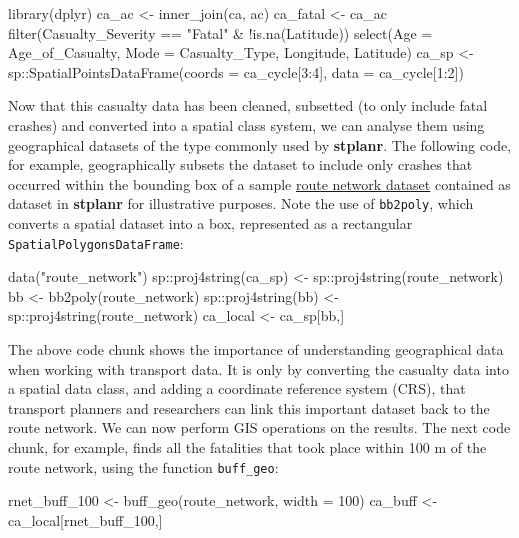 \begin{Schunk}
\begin{Sinput}
library(dplyr)
ca_ac <- inner_join(ca, ac)
ca_fatal <- ca_ac %
  filter(Casualty_Severity == "Fatal" & !is.na(Latitude)) %
  select(Age = Age_of_Casualty, Mode = Casualty_Type, Longitude, Latitude)
ca_sp <- sp::SpatialPointsDataFrame(coords = ca_cycle[3:4], data = ca_cycle[1:2])
\end{Sinput}
\end{Schunk}

Now that this casualty data has been cleaned, subsetted (to only include
fatal crashes) and converted into a spatial class system, we can
analyse them using geographical datasets of the type commonly used by
\textbf{stplanr}. The following code, for example, geographically
subsets the dataset to include only crashes that occurred within the
bounding box of a sample
\href{https://github.com/ropensci/stplanr/blob/master/data/route_network.rda?raw=true}{route
network dataset} contained as dataset in \textbf{stplanr} for illustrative purposes.
Note the use of \texttt{bb2poly}, which converts a spatial
dataset into a box, represented as a rectangular
\texttt{SpatialPolygonsDataFrame}:

\begin{Schunk}
\begin{Sinput}
data("route_network")
sp::proj4string(ca_sp) <- sp::proj4string(route_network)
bb <- bb2poly(route_network)
sp::proj4string(bb) <- sp::proj4string(route_network)
ca_local <- ca_sp[bb,]
\end{Sinput}
\end{Schunk}

The above code chunk shows the importance of understanding geographical
data when working with transport data. It is only by converting the
casualty data into a spatial data class, and adding a coordinate
reference system (CRS), that transport planners and researchers can link
this important dataset back to the route network. We can now perform GIS
operations on the results. The next code chunk, for example, finds all
the fatalities that took place within 100 m of the route network, using
the function \texttt{buff\_geo}:

\begin{Schunk}
\begin{Sinput}
rnet_buff_100 <- buff_geo(route_network, width = 100)
ca_buff <- ca_local[rnet_buff_100,]
\end{Sinput}
\end{Schunk}


